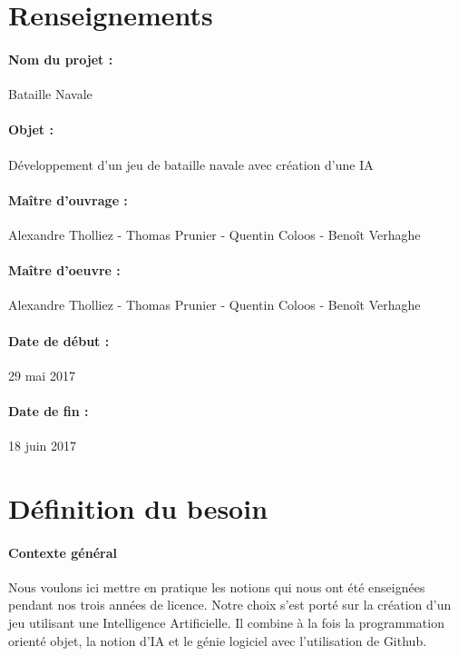 \documentclass[a4paper,oneside]{article}
\title{\mytitle }
\author{Alexandre Tholliez - Thomas Prunier - Quentin Coloos - Benoît Verhaghe}
\date{29 mai 2017}
\begin{document}
\maketitle

\thispagestyle{fancyplain}



\section{Renseignements}

\paragraph{Nom du projet :}
Bataille Navale

\paragraph{Objet :}
Développement d'un jeu de bataille navale avec création d'une IA

\paragraph{Maître d'ouvrage :}
Alexandre Tholliez - Thomas Prunier - Quentin Coloos - Benoît Verhaghe

\paragraph{Maître d'oeuvre : }
Alexandre Tholliez - Thomas Prunier - Quentin Coloos - Benoît Verhaghe

\paragraph{Date de début :}
29 mai 2017

\paragraph{Date de fin :}
18 juin 2017



\newpage

\section{Définition du besoin}

\paragraph{Contexte général\\}
Nous voulons ici mettre en pratique les notions qui nous ont été enseignées pendant nos trois années de licence.
Notre choix s'est porté sur la création d'un jeu utilisant une Intelligence Artificielle.
Il combine à la fois la programmation orienté objet, la notion d'IA et le génie logiciel avec l'utilisation de
Github.
\end{document}
